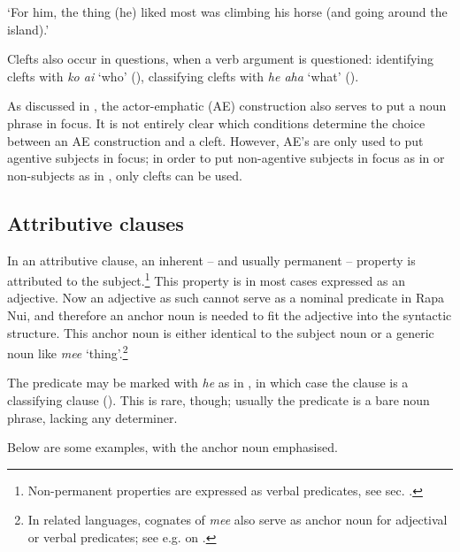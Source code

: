 \glt 
‘For him, the thing (he) liked most was climbing his horse (and going around the island).’ \textstyleExampleref{[R439.008]} 
\z
{}

Clefts also occur in questions, when a verb argument is questioned: identifying clefts with \textit{ko ai} ‘who’ (), classifying clefts with \textit{he aha} ‘what’ ().

As discussed in , the actor-emphatic (AE) construction also serves to put a noun phrase in focus. It is not entirely clear which conditions determine the choice between an AE construction and a cleft. However, AE’s are only used to put agentive subjects in focus; in order to put non-agentive subjects in focus as in  or non-subjects as in , only clefts can be used.

\subsection{Attributive clauses}\label{sec:9.2.7}
In an attributive clause, an inherent – and usually permanent – property is attributed to the subject.\footnote{\label{fn:470}Non-permanent properties are expressed as verbal predicates, see sec. .} This property is in most cases expressed as an adjective. Now an adjective as such cannot serve as a nominal predicate in Rapa Nui, and therefore an anchor noun is needed to fit the adjective into the syntactic structure. This anchor noun is either identical to the subject noun or a generic noun like \textit{me{\ꞌ}e} ‘thing’.\footnote{\label{fn:471}In related languages, cognates of \textit{me{\ꞌ}e} also serve as anchor noun for adjectival or verbal predicates; see e.g. \citet[38]{LazardPeltzer2000} on .} 

The predicate may be marked with \textit{he} as in , in which case the clause is a classifying clause (). This is rare, though; usually the predicate is a bare noun phrase, lacking any determiner.

Below are some examples, with the anchor noun emphasised.

